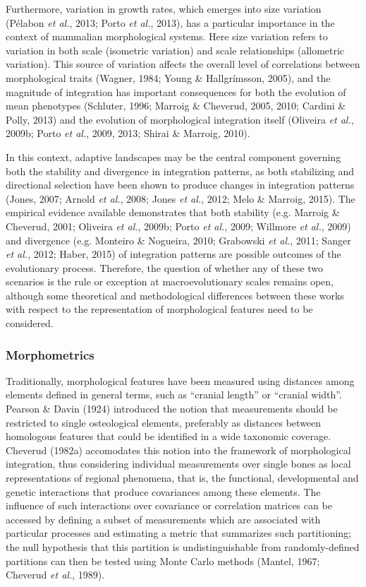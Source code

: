 \documentclass[12pt,twoside]{report}
\begin{document}
Furthermore, variation in growth rates, which emerges into size
variation (Pélabon \emph{et al.}, 2013; Porto \emph{et al.}, 2013), has
a particular importance in the context of mammalian morphological
systems. Here size variation refers to variation in both scale
(isometric variation) and scale relationships (allometric variation).
This source of variation affects the overall level of correlations
between morphological traits (Wagner, 1984; Young \& Hallgrímsson,
2005), and the magnitude of integration has important consequences for
both the evolution of mean phenotypes (Schluter, 1996; Marroig \&
Cheverud, 2005, 2010; Cardini \& Polly, 2013) and the evolution of
morphological integration itself (Oliveira \emph{et al.}, 2009b; Porto
\emph{et al.}, 2009, 2013; Shirai \& Marroig, 2010).

In this context, adaptive landscapes may be the central component
governing both the stability and divergence in integration patterns, as
both stabilizing and directional selection have been shown to produce
changes in integration patterns (Jones, 2007; Arnold \emph{et al.},
2008; Jones \emph{et al.}, 2012; Melo \& Marroig, 2015). The empirical
evidence available demonstrates that both stability (e.g. Marroig \&
Cheverud, 2001; Oliveira \emph{et al.}, 2009b; Porto \emph{et al.},
2009; Willmore \emph{et al.}, 2009) and divergence (e.g. Monteiro \&
Nogueira, 2010; Grabowski \emph{et al.}, 2011; Sanger \emph{et al.},
2012; Haber, 2015) of integration patterns are possible outcomes of the
evolutionary process. Therefore, the question of whether any of these
two scenarios is the rule or exception at macroevolutionary scales
remains open, although some theoretical and methodological differences
between these works with respect to the representation of morphological
features need to be considered.

\subsubsection{Morphometrics}\label{morphometrics}

Traditionally, morphological features have been measured using distances
among elements defined in general terms, such as ``cranial length'' or
``cranial width''. Pearson \& Davin (1924) introduced the notion that
measurements should be restricted to single osteological elements,
preferably as distances between homologous features that could be
identified in a wide taxonomic coverage. Cheverud (1982a) accomodates
this notion into the framework of morphological integration, thus
considering individual measurements over single bones as local
representations of regional phenomena, that is, the functional,
developmental and genetic interactions that produce covariances among
these elements. The influence of such interactions over covariance or
correlation matrices can be accessed by defining a subset of
measurements which are associated with particular processes and
estimating a metric that summarizes such partitioning; the null
hypothesis that this partition is undistinguishable from
randomly-defined partitions can then be tested using Monte Carlo methods
(Mantel, 1967; Cheverud \emph{et al.}, 1989).
\end{document}
